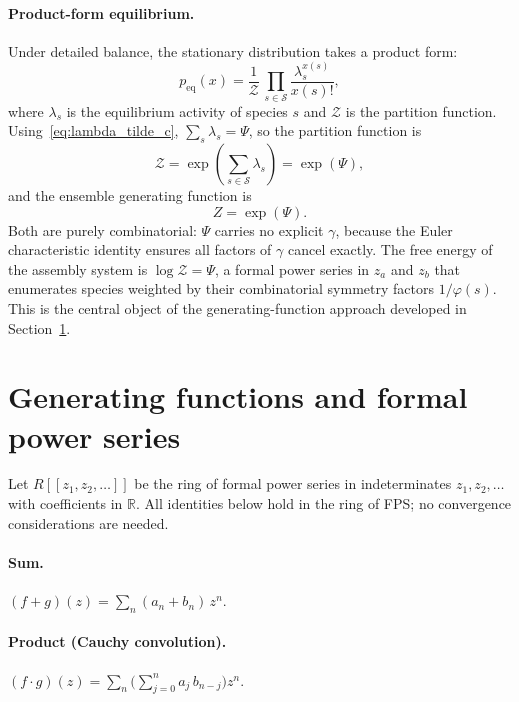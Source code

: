 \documentclass[11pt]{amsart}
\newcommand{\Species}{\mathcal{S}}
\newcommand{\GFensemble}{Z}
\newcommand{\GFcomb}{\Psi}
\theoremstyle{definition}
\theoremstyle{plain}
\theoremstyle{remark}
\begin{document}
\paragraph{Product-form equilibrium.}
Under detailed balance, the stationary distribution takes a product form:
\begin{equation}\label{eq:product_form}
p_{\mathrm{eq}}(x) = \frac{1}{\mathcal{Z}}\,\prod_{s\in\Species}
\frac{\lambda_s^{x(s)}}{x(s)!},
\end{equation}
where $\lambda_s$ is the equilibrium activity of species $s$ and $\mathcal{Z}$ is the partition function.
Using~\eqref{eq:lambda_tilde_c}, $\sum_s \lambda_s = \GFcomb$, so the partition function is
\begin{equation}\label{eq:partition_function}
\mathcal{Z} = \exp\!\left(\sum_{s\in\Species}\lambda_s\right) = \exp(\GFcomb),
\end{equation}
and the ensemble generating function is
\begin{equation}\label{eq:ensemble_gf_dynamics}
\GFensemble = \exp(\GFcomb).
\end{equation}
Both are purely combinatorial: $\GFcomb$ carries no explicit $\gamma$, because the Euler characteristic identity ensures all factors of $\gamma$ cancel exactly.
The free energy of the assembly system is $\log\mathcal{Z} = \GFcomb$, a formal power series in $z_a$ and $z_b$ that enumerates species weighted by their combinatorial symmetry factors $1/\varphi(s)$.
This is the central object of the generating-function approach developed in Section~\ref{sec:gf}.


\section{Generating functions and formal power series}
\label{sec:gf}

Let $R[\![z_1,z_2,\dots]\!]$ be the ring of formal power series in indeterminates $z_1,z_2,\ldots$ with coefficients in $\mathbb{R}$.
All identities below hold in the ring of FPS; no convergence considerations are needed.

\paragraph{Sum.}
$(f+g)(z) = \sum_n (a_n+b_n)\,z^n$.

\paragraph{Product (Cauchy convolution).}
$(f\cdot g)(z) = \sum_n \bigl(\sum_{j=0}^n a_j\,b_{n-j}\bigr) z^n$.
\end{document}
